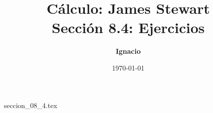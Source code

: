 \documentclass[11pt,spanish,oneside]{report}
\title{\textbf{Cálculo: James Stewart} \\ \Large Sección 8.4: Ejercicios}
\author{\textbf{Ignacio}}
\date{\today}
\begin{document}
\maketitle

{seccion_08_4.tex}
\end{document}
